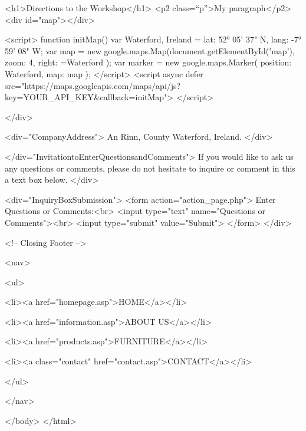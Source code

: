 	<h1>Directions to the Workshop</h1>
    <p2 class=“p”>My paragraph</p2> 
	<div id="map"></div>
    
	<script>
      function initMap() {
        var Waterford, Ireland = {lat: 52° 05' 37" N, lang: -7° 59' 08" W};
        var map = new google.maps.Map(document.getElementById('map'), {
          zoom: 4,
          right: =Waterford
        });
        var marker = new google.maps.Marker({
          position: Waterford,
          map: map
        });
      }
    </script>
    <script async defer
    src="https://maps.googleapis.com/maps/api/js?key=YOUR_API_KEY&callback=initMap">
    </script>


</div>

<div="CompanyAddress">
      An Rinn, 
      County Waterford,
      Ireland.
</div>

</div="InvitationtoEnterQuestionsandComments"> 
       If you would like to ask us any questions 
	   or comments, please do not hesitate to inquire 
	   or comment in this a text box below.
</div> 



<div="InquiryBoxSubmission"> 
      <form action="action_page.php">
	   Enter Questions or Comments:<br>
      <input type="text" name="Questions or Comments"><br> 
      <input type="submit" value="Submit">
      </form>
</div>

	  <!-- Closing Footer -->

<nav>

  <ul>

     <li><a href="homepage.asp">HOME</a></li>

	 <li><a href="information.asp">ABOUT US</a></li>

  	 <li><a href="products.asp">FURNITURE</a></li>

  	 <li><a class="contact" href="contact.asp">CONTACT</a></li>

 </ul>

</nav>


</body>
</html> 